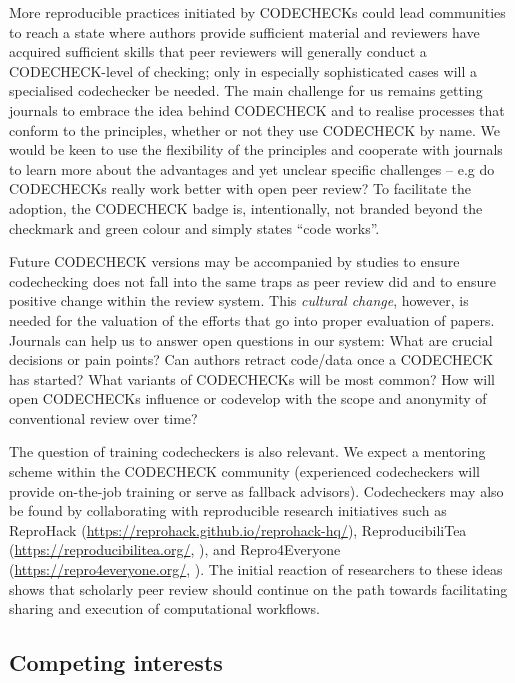 \documentclass[12pt]{article}
\begin{document}
More reproducible practices initiated by CODECHECKs could lead
communities to reach a state where authors provide sufficient material
and reviewers have acquired sufficient skills that peer reviewers will
generally conduct a CODECHECK-level of checking; only in especially
sophisticated cases will a specialised codechecker be needed.  The
main challenge for us remains getting journals to embrace the idea
behind CODECHECK and to realise processes that conform to the
principles, whether or not they use CODECHECK by name.  We would be
keen to use the flexibility of the principles and cooperate with
journals to learn more about the advantages and yet unclear specific
challenges -- e.g do CODECHECKs really work better with open peer review?  To
facilitate the adoption, the CODECHECK badge is, intentionally, not
branded beyond the checkmark and green colour and simply states ``code
works''.

Future CODECHECK versions may be accompanied by studies to ensure
codechecking does not fall into the same traps as peer review did
\cite{tennant_limitations_2020} and to ensure positive change within
the review system.  This \emph{cultural change}, however, is needed
for the valuation of the efforts that go into proper evaluation of
papers.  Journals can help us to answer open questions in our system: What are
crucial decisions or pain points? Can authors retract code/data once a
CODECHECK has started?  What variants of CODECHECKs will be most
common? How will open CODECHECKs influence or codevelop with the scope
and anonymity of conventional review over time?

The question of training codecheckers is also relevant. We expect a
mentoring scheme within the CODECHECK community (experienced
codecheckers will provide on-the-job training or serve as fallback
advisors). Codecheckers may also be found by collaborating with
reproducible research initiatives such as
ReproHack (\url{https://reprohack.github.io/reprohack-hq/}),
ReproducibiliTea (\url{https://reproducibilitea.org/},
\cite{fitzgibbon_brewing_2020}), and
Repro4Everyone (\url{https://repro4everyone.org/},
\cite{auer_reproducibility_2020}).  The initial reaction of 
researchers to these ideas shows that scholarly peer review
should continue on the path towards facilitating sharing and
execution of computational workflows.

\subsection*{Competing interests}
\end{document}
